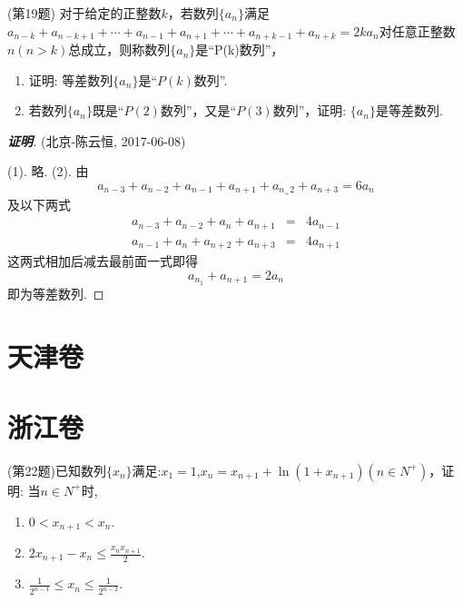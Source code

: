 \documentclass{ctexart}
\begin{document}
\begin{exercise}(第19题)
  对于给定的正整数$k$，若数列$\{a_n\}$满足$a_{n-k}+a_{n-k+1}+\cdots+a_{n-1}+a_{n+1}+\cdots+a_{n+k-1}+a_{n+k}=2ka_n$对任意正整数$n(n>k)$总成立，则称数列$\{a_n\}$是“P(k)数列”，
  \begin{enumerate}
  \item 证明: 等差数列$\{a_n\}$是“$P(k)$数列”.
  \item 若数列$\{a_n\}$既是“$P(2)$数列”，又是“$P(3)$数列”，证明: $\{a_n\}$是等差数列.
  \end{enumerate}
\end{exercise}

\begin{proof}[\textbf{证明}] (北京-陈云恒, 2017-06-08)

  (1). 略.
  (2). 由
  \[ a_{n-3}+a_{n-2}+a_{n-1}+a_{n+1}+a_{n_+2}+a_{n+3}=6a_n \]
  及以下两式
  \begin{eqnarray*}
    a_{n-3}+a_{n-2}+a_n+a_{n+1} & = &4a_{n-1} \\
    a_{n-1}+a_n+a_{n+2}+a_{n+3} & = &4a_{n+1} 
  \end{eqnarray*}
  这两式相加后减去最前面一式即得
  \[ a_{n_1}+a_{n+1}=2a_n \]
  即为等差数列.
\end{proof}

\section{天津卷}
\label{sec:tianjin}

\section{浙江卷}
\label{sec:zhejiang}

\begin{exercise}(第22题)已知数列$\{x_n\}$满足:$x_1=1$,$x_n=x_{n+1}+\ln{(1+x_{n+1})}(n \in N^+)$，证明: 当$n \in N^+$时,
  \begin{enumerate}
  \item $0<x_{n+1}<x_n$.
  \item $2x_{n+1}-x_n \leqslant \frac{x_nx_{n+1}}{2}$.
  \item $\frac{1}{2^{n-1}} \leqslant x_n \leqslant \frac{1}{2^{n-2}}$.
  \end{enumerate}
\end{exercise}
\end{document}
